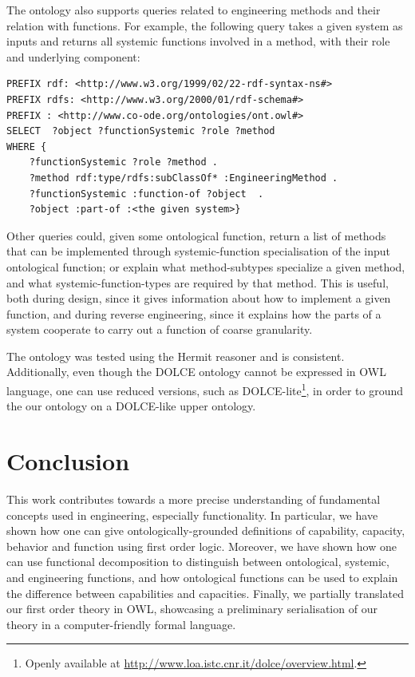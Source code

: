 \documentclass[sw]{iosart2x}
\newcommand{\DOLCE}{\textsc{DOLCE}\xspace} %
\newcommand{\OWL}{\textnormal{OWL}\xspace}
\begin{document}
The ontology also supports queries related to engineering methods and their relation with functions.
For example, the following query takes a given system as inputs and returns all systemic functions involved in a method, with their role and underlying component:
\begin{verbatim}
PREFIX rdf: <http://www.w3.org/1999/02/22-rdf-syntax-ns#>
PREFIX rdfs: <http://www.w3.org/2000/01/rdf-schema#>
PREFIX : <http://www.co-ode.org/ontologies/ont.owl#>
SELECT  ?object ?functionSystemic ?role ?method 
WHERE { 
    ?functionSystemic ?role ?method .
    ?method rdf:type/rdfs:subClassOf* :EngineeringMethod .
    ?functionSystemic :function-of ?object  .
    ?object :part-of :<the given system>}
\end{verbatim}

Other queries could, given some ontological function, return a list of methods that can be implemented through systemic-function specialisation of the input ontological function; or explain what method-subtypes specialize a given method, and what systemic-function-types are required by that method. This is useful, both during design, since it gives information about how to implement a given function, and during reverse engineering, since it explains how the parts of a system cooperate to carry out a function of coarse granularity. 

The ontology was tested using the Hermit reasoner and is consistent.
Additionally, even though the \DOLCE ontology cannot be expressed in \OWL language, one can use reduced versions, such as \DOLCE-lite\footnote{Openly available at \url{http://www.loa.istc.cnr.it/dolce/overview.html}.}, in order to ground the our ontology on a \DOLCE-like upper ontology.

\section{Conclusion}\label{sec:conc}
This work contributes towards a more precise understanding of fundamental concepts used in engineering, especially functionality.
In particular, we have shown how one can give ontologically-grounded definitions of capability, capacity, behavior and function using first order logic.
Moreover, we have shown how one can use functional decomposition to distinguish between ontological, systemic, and engineering functions, and how ontological functions can be used to explain the difference between capabilities and capacities.
Finally, we partially translated our first order theory in \OWL, showcasing a preliminary serialisation of our theory in a computer-friendly formal language.
\end{document}
